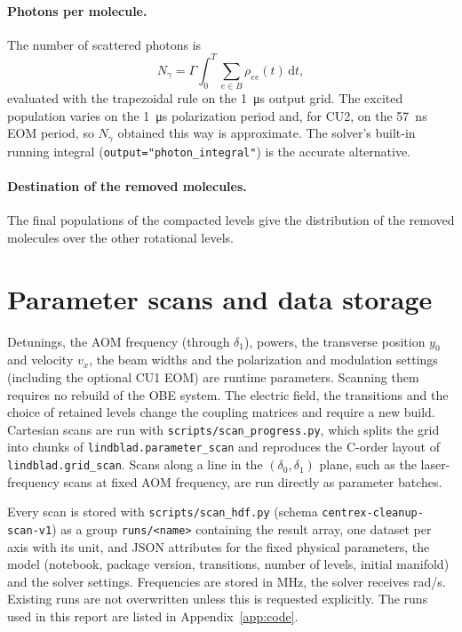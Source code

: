 \documentclass[11pt,a4paper,oneside]{report}
\newcommand{\code}[1]{\texttt{#1}}
\newcommand{\Ngam}{N_{\gamma}}
\begin{document}
\paragraph{Photons per molecule.} The number of scattered photons is
\begin{equation}
  \Ngam=\Gamma\int_0^T\sum_{e\in B}\rho_{ee}(t)\,\mathrm dt,
\end{equation}
evaluated with the trapezoidal rule on the \SI{1}{\micro\second} output grid. The excited
population varies on the \SI{1}{\micro\second} polarization period and, for CU2, on the
\SI{57}{ns} EOM period, so $\Ngam$ obtained this way is approximate. The solver's built-in
running integral (\code{output="photon\_integral"}) is the accurate alternative.

\paragraph{Destination of the removed molecules.} The final populations of the compacted
levels give the distribution of the removed molecules over the other rotational levels.

\section{Parameter scans and data storage}
\label{sec:scans}

Detunings, the AOM frequency (through $\delta_1$), powers, the transverse position $y_0$ and
velocity $v_x$, the beam widths and the polarization and modulation settings (including the
optional CU1 EOM) are runtime parameters. Scanning
them requires no rebuild of the OBE system. The electric field, the transitions and the choice
of retained levels change the coupling matrices and require a new build. Cartesian scans are
run with \code{scripts/scan\_progress.py}, which splits the grid into chunks of
\code{lindblad.parameter\_scan} and reproduces the C-order layout of
\code{lindblad.grid\_scan}. Scans along a line in the $(\delta_0,\delta_1)$ plane, such as the
laser-frequency scans at fixed AOM frequency, are run directly as parameter batches.

Every scan is stored with \code{scripts/scan\_hdf.py} (schema
\code{centrex-cleanup-scan-v1}) as a group \code{runs/<name>} containing the result array,
one dataset per axis with its unit, and JSON attributes for the fixed physical parameters,
the model (notebook, package version, transitions, number of levels, initial manifold) and
the solver settings. Frequencies are stored in MHz, the solver receives rad/s. Existing runs
are not overwritten unless this is requested explicitly. The runs used in this report are
listed in Appendix~\ref{app:code}.
\end{document}

